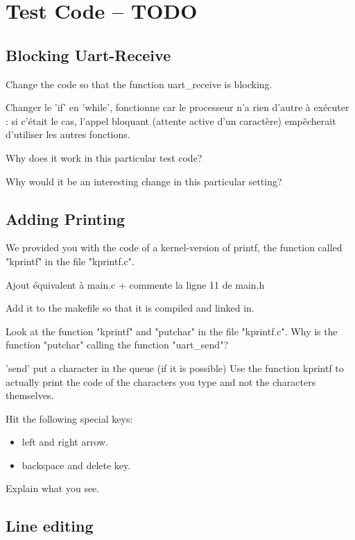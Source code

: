 \documentclass[10]{article}
\begin{document}
\section{Test Code -- TODO}

\subsection{Blocking Uart-Receive}

Change the code so that the function uart\_receive is blocking.

Changer le 'if' en 'while', fonctionne car le processeur n'a rien d'autre à exécuter : si c'était le cas, l'appel bloquant (attente active d'un caractère) empêcherait d'utiliser les autres fonctions. 

Why does it work in this particular test code?

Why would it be an interesting change in this particular setting?

\subsection{Adding Printing}

We provided you with the code of a kernel-version of printf,
the function called "kprintf" in the file "kprintf.c".

Ajout équivalent à main.c + commente la ligne 11 de main.h

Add it to the makefile so that it is compiled and linked in.

Look at the function "kprintf" and "putchar" in the file
"kprintf.c". Why is the function "putchar" calling the
function "uart\_send"?

'send' put a character in the queue (if it is possible) 
Use the function kprintf to actually print the code of the
characters you type and not the characters themselves.

Hit the following special keys:

\begin{itemize}
\item left and right arrow.
\item backspace and delete key.
\end{itemize}

Explain what you see.
      
\subsection{Line editing}
\end{document}
